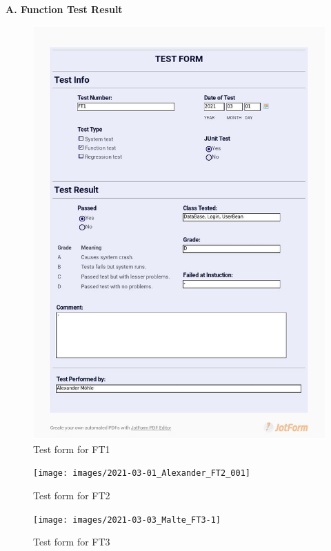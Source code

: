\documentclass{article}
\begin{document}
\newpage
\begin{flushleft}
{\large\textbf{A. Function Test Result}}
\end{flushleft}

\begin{figure}
     \centering
     \includegraphics[trim={1cm 3cm 1cm 1.5cm}, clip,width=13cm]{images/2021_03_01_Alexander_FT1_001}
     \renewcommand\figurename{Figure}
     \caption{Test form for FT1}
     \label{fig:my_label}
 \end{figure}
 
 \begin{figure}
     \centering
     \texttt{[image: images/2021-03-01\_Alexander\_FT2\_001]}
     \renewcommand\figurename{Figure}
     \caption{Test form for FT2}
     \label{fig:my_label}
 \end{figure}
 
  \begin{figure}
     \centering
      \texttt{[image: images/2021-03-03\_Malte\_FT3-1]}
     \renewcommand\figurename{Figure}
     \caption{Test form for FT3}
     \label{fig:my_label}
 \end{figure}
 
\end{document}

